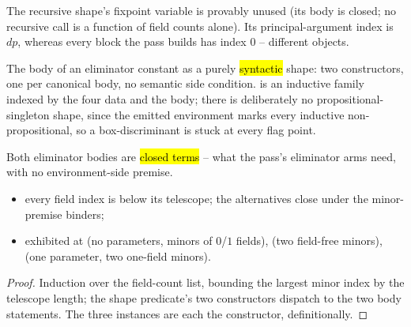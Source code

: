 \begin{remark}
 The recursive shape's fixpoint variable is provably unused (its body is closed; no
recursive call is a function of field counts alone). Its principal-argument index is $dp$, whereas every
block the pass builds has index $0$ -- different objects.
\end{remark}

\begin{definition}
\label{def:ElimBody}
\leanok
{}
 The \lbox{} body of an eliminator constant as a purely \hl{syntactic} shape: two
constructors, one per canonical body, no semantic side condition.
  is an inductive family indexed by the four data and the body; there is
deliberately no propositional-singleton shape, since the emitted environment marks every inductive
non-propositional, so a box-discriminant  is stuck at every flag point.
\end{definition}

\begin{lemma}
\label{lem:ElimBody-closed}
\leanok
{}
 Both eliminator bodies are \hl{closed terms} -- what the pass's eliminator arms need,
with no environment-side premise.
\begin{itemize}
\item every field index is below its telescope; the alternatives close under the minor-premise binders;
\item exhibited at  (no parameters, minors of $0$/$1$ fields), 
(two field-free minors),  (one parameter, two one-field minors).
\end{itemize}
\end{lemma}
\begin{proof}
\leanok
{}
 Induction over the field-count list, bounding the largest minor index by the telescope
length; the shape predicate's two constructors dispatch to the two body statements. The three instances
are each the  constructor, definitionally.
\end{proof}

